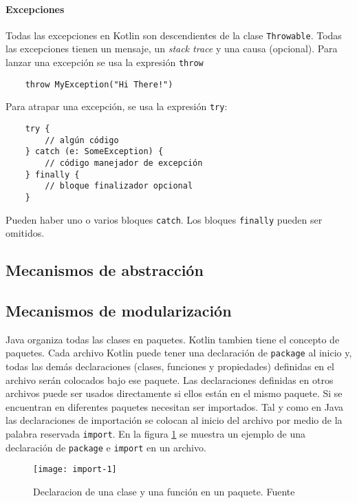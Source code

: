 \paragraph{Excepciones}
Todas las excepciones en Kotlin son descendientes de la clase \texttt{Throwable}. Todas las excepciones tienen un mensaje, un \emph{stack trace} y una causa (opcional). Para lanzar una excepción se usa la expresión \texttt{throw}
\begin{verbatim}
    throw MyException("Hi There!")
\end{verbatim}

Para atrapar una excepción, se usa la expresión \texttt{try}:
\begin{verbatim}
    try {
        // algún código
    } catch (e: SomeException) {
        // código manejador de excepción
    } finally {
        // bloque finalizador opcional
    }
\end{verbatim}
Pueden haber uno o varios bloques \texttt{catch}. Los bloques \texttt{finally} pueden ser omitidos. 

\subsection{Mecanismos de abstracción}

\subsection{Mecanismos de modularización}
Java organiza todas las clases en paquetes. Kotlin tambien tiene el concepto de paquetes. Cada archivo Kotlin puede tener una declaración de \texttt{package} al inicio y, todas las demás declaraciones (clases, funciones y propiedades) definidas en el archivo serán colocados bajo ese paquete. Las declaraciones definidas en otros archivos puede ser usados directamente si ellos están en el mismo paquete. Si se encuentran en diferentes paquetes necesitan ser importados. Tal y como en Java las declaraciones de importación se colocan al inicio del archivo por medio de la palabra reservada \texttt{import}. En la figura \ref{fig:import-1} se muestra un ejemplo de una declaración de \texttt{package} e \texttt{import} en un archivo.

\begin{figure}[h!]
  \texttt{[image: import-1]}
  \caption{Declaracion de una clase y una función en un paquete. Fuente \cite{kotlin-in-action}}
  \label{fig:import-1}
\end{figure}  

